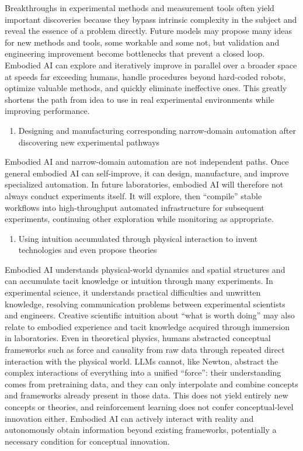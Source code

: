 Breakthroughs in experimental methods and measurement tools often yield important discoveries because they bypass intrinsic complexity in the subject and reveal the essence of a problem directly. Future models may propose many ideas for new methods and tools, some workable and some not, but validation and engineering improvement become bottlenecks that prevent a closed loop. Embodied AI can explore and iteratively improve in parallel over a broader space at speeds far exceeding humans, handle procedures beyond hard-coded robots, optimize valuable methods, and quickly eliminate ineffective ones. This greatly shortens the path from idea to use in real experimental environments while improving performance.

\begin{enumerate}
\def\labelenumi{\arabic{enumi}.}
\setcounter{enumi}{2}
\tightlist
\item
  Designing and manufacturing corresponding narrow-domain automation after discovering new experimental pathways
\end{enumerate}

Embodied AI and narrow-domain automation are not independent paths. Once general embodied AI can self-improve, it can design, manufacture, and improve specialized automation. In future laboratories, embodied AI will therefore not always conduct experiments itself. It will explore, then ``compile'' stable workflows into high-throughput automated infrastructure for subsequent experiments, continuing other exploration while monitoring as appropriate.

\begin{enumerate}
\def\labelenumi{\arabic{enumi}.}
\setcounter{enumi}{3}
\tightlist
\item
  Using intuition accumulated through physical interaction to invent technologies and even propose theories
\end{enumerate}

Embodied AI understands physical-world dynamics and spatial structures and can accumulate tacit knowledge or intuition through many experiments. In experimental science, it understands practical difficulties and unwritten knowledge, resolving communication problems between experimental scientists and engineers. Creative scientific intuition about ``what is worth doing'' may also relate to embodied experience and tacit knowledge acquired through immersion in laboratories. Even in theoretical physics, humans abstracted conceptual frameworks such as force and causality from raw data through repeated direct interaction with the physical world. LLMs cannot, like Newton, abstract the complex interactions of everything into a unified ``force'': their understanding comes from pretraining data, and they can only interpolate and combine concepts and frameworks already present in those data. This does not yield entirely new concepts or theories, and reinforcement learning does not confer conceptual-level innovation either. Embodied AI can actively interact with reality and autonomously obtain information beyond existing frameworks, potentially a necessary condition for conceptual innovation.

